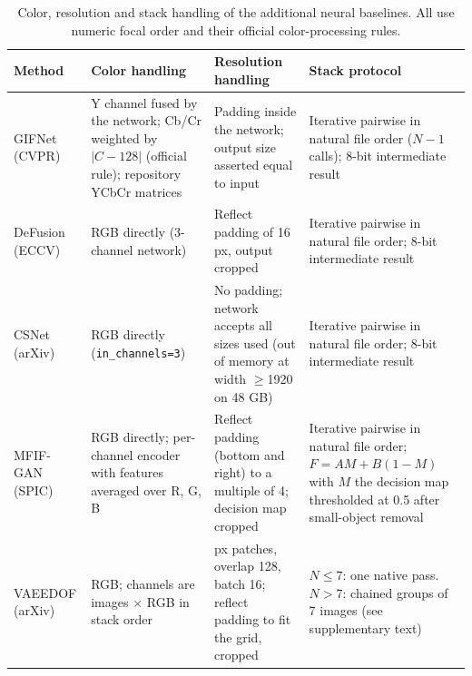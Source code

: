 \begin{table}[htbp]
\caption{Color, resolution and stack handling of the additional neural baselines. All use numeric focal order and their official color-processing rules.}
\label{tab:deploy_handling}
\scriptsize
\renewcommand{\arraystretch}{0.95}
\setlength{\abovecaptionskip}{2pt}
\setlength{\belowcaptionskip}{2pt}
\begin{tabular}{@{}>{\raggedright\arraybackslash}p{1.9cm}>{\raggedright\arraybackslash}p{3.1cm}>{\raggedright\arraybackslash}p{3.1cm}>{\raggedright\arraybackslash}p{3.8cm}@{}}
\toprule
Method & Color handling & Resolution handling & Stack protocol \\
\midrule
GIFNet (CVPR)~\cite{cheng2025gifnet} & Y channel fused by the network; Cb/Cr weighted by $|C-128|$ (official rule); repository YCbCr matrices & Padding inside the network; output size asserted equal to input & Iterative pairwise in natural file order ($N-1$ calls); 8-bit intermediate result \\
DeFusion (ECCV)~\cite{liang2022defusion} & RGB directly (3-channel network) & Reflect padding of 16 px, output cropped & Iterative pairwise in natural file order; 8-bit intermediate result \\
CSNet (arXiv)~\cite{csnet2026} & RGB directly (\texttt{in\_channels=3}) & No padding; network accepts all sizes used (out of memory at width $\geq$1920 on 48 GB) & Iterative pairwise in natural file order; 8-bit intermediate result \\
MFIF-GAN (SPIC)~\cite{wang2021mfifgan} & RGB directly; per-channel encoder with features averaged over R, G, B & Reflect padding (bottom and right) to a multiple of 4; decision map cropped & Iterative pairwise in natural file order; $F=AM+B(1-M)$ with $M$ the decision map thresholded at 0.5 after small-object removal \\
VAEEDOF (arXiv)~\cite{vaeedof2025} & RGB; channels are images $\times$ RGB in stack order & 512 px patches, overlap 128, batch 16; reflect padding to fit the grid, cropped & $N\leq7$: one native pass. $N>7$: chained groups of 7 images (see supplementary text) \\
\bottomrule
\end{tabular}
\end{table}
